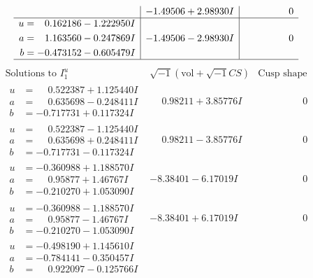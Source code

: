 \documentclass[1p]{elsarticle_modified}
\theoremstyle{definition}
\newcommand{\I}{\sqrt{-1}}
\begin{document}
$$\begin{array}{c|c|c}
 & -1.49506 + 2.98930 I & \phantom{-0.000000 } 0 \\ \hline\begin{aligned}
u &= \phantom{-}0.162186 - 1.222950 I \\
a &= \phantom{-}1.163560 - 0.247869 I \\
b &= -0.473152 - 0.605479 I\end{aligned}
 & -1.49506 - 2.98930 I & \phantom{-0.000000 } 0\\
 \hline 
 \end{array}$$\newpage$$\begin{array}{c|c|c}  
\text{Solutions to }I^u_{1}& \I (\text{vol} + \sqrt{-1}CS) & \text{Cusp shape}\\
 \hline 
\begin{aligned}
u &= \phantom{-}0.522387 + 1.125440 I \\
a &= \phantom{-}0.635698 - 0.248411 I \\
b &= -0.717731 + 0.117324 I\end{aligned}
 & \phantom{-}0.98211 + 3.85776 I & \phantom{-0.000000 } 0 \\ \hline\begin{aligned}
u &= \phantom{-}0.522387 - 1.125440 I \\
a &= \phantom{-}0.635698 + 0.248411 I \\
b &= -0.717731 - 0.117324 I\end{aligned}
 & \phantom{-}0.98211 - 3.85776 I & \phantom{-0.000000 } 0 \\ \hline\begin{aligned}
u &= -0.360988 + 1.188570 I \\
a &= \phantom{-}0.95877 + 1.46767 I \\
b &= -0.210270 + 1.053090 I\end{aligned}
 & -8.38401 - 6.17019 I & \phantom{-0.000000 } 0 \\ \hline\begin{aligned}
u &= -0.360988 - 1.188570 I \\
a &= \phantom{-}0.95877 - 1.46767 I \\
b &= -0.210270 - 1.053090 I\end{aligned}
 & -8.38401 + 6.17019 I & \phantom{-0.000000 } 0 \\ \hline\begin{aligned}
u &= -0.498190 + 1.145610 I \\
a &= -0.784141 - 0.350457 I \\
b &= \phantom{-}0.922097 - 0.125766 I\end{aligned}

\end{array}$$
\end{document}
